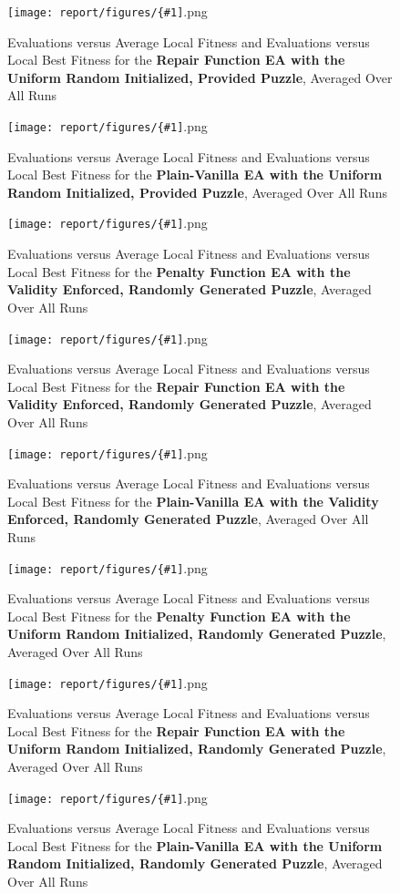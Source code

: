 \documentclass[11pt]{article}
\newcommand{\fitnessplotcaption}[1]{\caption{Evaluations versus Average Local Fitness and Evaluations versus 
    Local Best Fitness for the \textbf{{#1}}, Averaged Over All Runs}}
\newcommand{\addgraphic}[1]{\centerline{\texttt{[image: report/figures/\{\#1]}.png}}}
\begin{document}
\begin{figure}
    \addgraphic{website_puzzle_uniform_random_bonus_graph}
    \fitnessplotcaption{Repair Function EA with the Uniform Random Initialized, Provided Puzzle}
    \label{fig:website_puzzle_uniform_random_bonus_graph}
\end{figure}

\begin{figure}
    \addgraphic{website_puzzle_uniform_random_vanilla_graph}
    \fitnessplotcaption{Plain-Vanilla EA with the Uniform Random Initialized, Provided Puzzle}
    \label{fig:website_puzzle_uniform_random_vanilla_graph}
\end{figure}

\begin{figure}
    \addgraphic{random_gen_validity_enforced_graph}
    \fitnessplotcaption{Penalty Function EA with the Validity Enforced, Randomly Generated Puzzle}
    \label{fig:random_gen_validity_enforced_graph}
\end{figure}

\begin{figure}
    \addgraphic{random_gen_validity_enforced_bonus_graph}
    \fitnessplotcaption{Repair Function EA with the Validity Enforced, Randomly Generated Puzzle}
    \label{fig:random_gen_validity_enforced_bonus_graph}
\end{figure}

\begin{figure}
    \addgraphic{random_gen_validity_enforced_vanilla_graph}
    \fitnessplotcaption{Plain-Vanilla EA with the Validity Enforced, Randomly Generated Puzzle}
    \label{fig:random_gen_validity_enforced_vanilla_graph}
\end{figure}

\begin{figure}
    \addgraphic{random_gen_uniform_random_graph}
    \fitnessplotcaption{Penalty Function EA with the Uniform Random Initialized, Randomly Generated Puzzle}
    \label{fig:random_gen_uniform_random_graph}
\end{figure}

\begin{figure}
    \addgraphic{random_gen_uniform_random_bonus_graph}
    \fitnessplotcaption{Repair Function EA with the Uniform Random Initialized, Randomly Generated Puzzle}
    \label{fig:random_gen_uniform_random_bonus_graph}
\end{figure}

\begin{figure}
    \addgraphic{random_gen_uniform_random_vanilla_graph}
    \fitnessplotcaption{Plain-Vanilla EA with the Uniform Random Initialized, Randomly Generated Puzzle}
    \label{fig:random_gen_uniform_random_vanilla_graph}
\end{figure}
\end{document}
